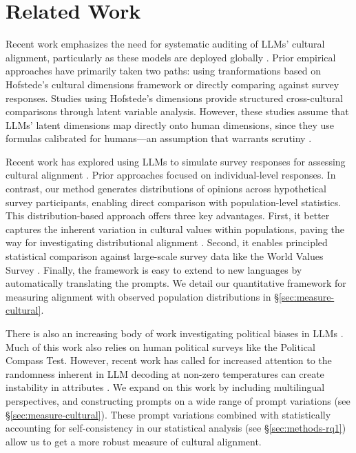 \section{Related Work}
Recent work emphasizes the need for systematic auditing of LLMs' cultural alignment, particularly as these models are deployed globally \citep{kirkBenefitsRisksBounds2024, mokanderAuditingLargeLanguage2024,kirkPRISMAlignmentDataset2024}. Prior empirical approaches have primarily taken two paths: using tranformations based on Hofstede's cultural dimensions framework or directly comparing against survey responses. Studies using Hofstede's dimensions \citep{masoudCulturalAlignmentLarge2025, caoAssessingCrossculturalAlignment2023} provide structured cross-cultural comparisons through latent variable analysis. However, these studies assume that LLMs' latent dimensions map directly onto human dimensions, since they use formulas calibrated for humans---an assumption that warrants scrutiny \citep{shanahanTalkingLargeLanguage2024}.

Recent work has explored using LLMs to simulate survey responses for assessing cultural alignment \citep{taoCulturalBiasCultural2024,alkhamissiInvestigatingCulturalAlignment2024}. Prior approaches focused on individual-level responses. In contrast, our method generates distributions of opinions across hypothetical survey participants, enabling direct comparison with population-level statistics. This distribution-based approach offers three key advantages. First, it better captures the inherent variation in cultural values within populations, paving the way for investigating distributional alignment \citep{sorensenPositionRoadmapPluralistic2024}. Second, it enables principled statistical comparison against large-scale survey data like the World Values Survey \citep{evs/wvsJointEVSWVS2022}. Finally, the framework is easy to extend to new languages by automatically translating the prompts. We detail our quantitative framework for measuring alignment with observed population distributions in §\ref{sec:measure-cultural}.

There is also an increasing body of work investigating political biases in LLMs \cite{rottgerPoliticalCompassSpinning2024,rottgerIssueBenchMillionsRealistic2025,hartmannPoliticalIdeologyConversational2023}. Much of this work also relies on human political surveys like the Political Compass Test. However, recent work has called for increased attention to the randomness inherent in LLM decoding at non-zero temperatures can create instability in attributes \cite{rottgerPoliticalCompassSpinning2024,wrightLLMTropesRevealing2024}. We expand on this work by including multilingual perspectives, and constructing prompts on a wide range of prompt variations (see §\ref{sec:measure-cultural}). These prompt variations combined with statistically accounting for self-consistency in our statistical analysis (see §\ref{sec:methods-rq1}) allow us to get a more robust measure of cultural alignment.

